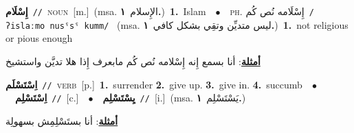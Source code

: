 \documentclass[10pt,a4paper,twoside]{article} %
\begin{document}
\begin{multicols}{2}
{\setlength\topsep{0pt}\textbf{\foreignlanguage{arabic}{إِسْلَام}}\ {\color{gray}\texttt{//}\color{black}}\ \textsc{noun}\ [m.]\ \color{gray}(msa. \foreignlanguage{arabic}{الإِسلام}~\foreignlanguage{arabic}{\textbf{١.}})\color{black}\ \textbf{1.}~Islam\ \ $\bullet$\ \ \textsc{ph.} \color{gray} \foreignlanguage{arabic}{إِسْلَامه نُص كُم}\color{black}\ {\color{gray}\texttt{/{\sffamily ʔislaːmo nusˤsˤ kumm}/}\color{black}}\ \color{gray} (msa. \foreignlanguage{arabic}{ليس متديِّن وتقِي بشكل كافي}~\foreignlanguage{arabic}{\textbf{١.}})\color{black}\ \textbf{1.}~not religious or pious enough\  \begin{flushright}\color{gray}\foreignlanguage{arabic}{\textbf{\underline{\foreignlanguage{arabic}{أمثلة}}}: أنا بسمع إِنه إِسْلامه نُص كُم مابعرف إِذا هلا تديَّن واستشيخ}\end{flushright}\color{black}} \vspace{2mm}

{\setlength\topsep{0pt}\textbf{\foreignlanguage{arabic}{اِسْتَسْلَم}}\ {\color{gray}\texttt{//}\color{black}}\ \textsc{verb}\ [p.]\ \textbf{1.}~surrender  \textbf{2.}~give up.  \textbf{3.}~give in.  \textbf{4.}~succumb\ \ $\bullet$\ \ \setlength\topsep{0pt}\textbf{\foreignlanguage{arabic}{اِسْتَسْلِم}}\ {\color{gray}\texttt{//}\color{black}}\ [c.]\ \ $\bullet$\ \ \setlength\topsep{0pt}\textbf{\foreignlanguage{arabic}{يِسْتَسْلِم}}\ {\color{gray}\texttt{//}\color{black}}\ [i.]\ \color{gray}(msa. \foreignlanguage{arabic}{يَسْتَسْلِم}~\foreignlanguage{arabic}{\textbf{١.}})\color{black}\  \begin{flushright}\color{gray}\foreignlanguage{arabic}{\textbf{\underline{\foreignlanguage{arabic}{أمثلة}}}: أنا بستَسْلِمِش بسهولِة}\end{flushright}\color{black}} \vspace{2mm}


\end{multicols}
\end{document}
